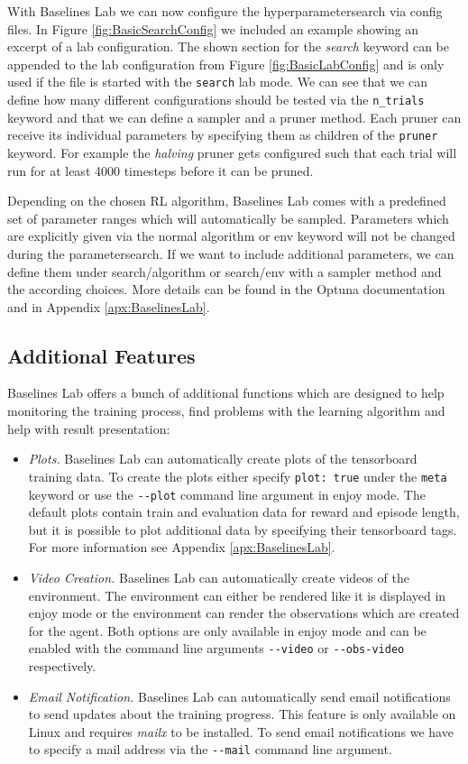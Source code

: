 With Baselines Lab we can now configure the hyperparametersearch via config files. In Figure \ref{fig:BasicSearchConfig} we included an example showing an excerpt of a lab configuration. The shown section for the \textit{search} keyword can be appended to the lab configuration from Figure \ref{fig:BasicLabConfig} and is only used if the file is started with the \texttt{search} lab mode. We can see that we can define how many different configurations should be tested via the \texttt{n\_trials} keyword and that we can define a sampler and a pruner method. Each pruner can receive its individual parameters by specifying them as children of the \texttt{pruner} keyword. For example the \textit{halving} pruner gets configured such that each trial will run for at least 4000 timesteps before it can be pruned.

Depending on the chosen RL algorithm, Baselines Lab comes with a predefined set of parameter ranges which will automatically be sampled. Parameters which are explicitly given via the normal algorithm or env keyword will not be changed during the parametersearch. If we want to include additional parameters, we can define them under search/algorithm or search/env with a sampler method and the according choices. More details can be found in the Optuna documentation \cite{optuna-docs} and in Appendix \ref{apx:BaselinesLab}.

\subsection{Additional Features} \label{sec:blAdvanced}
Baselines Lab offers a bunch of additional functions which are designed to help monitoring the training process, find problems with the learning algorithm and help with result presentation:

\begin{itemize}
    \item \textit{Plots.} Baselines Lab can automatically create plots of the tensorboard training data. To create the plots either specify \texttt{plot: true} under the \texttt{meta} keyword or use the \texttt{-{}-plot} command line argument in enjoy mode. The default plots contain train and evaluation data for reward and episode length, but it is possible to plot additional data by specifying their tensorboard tags. For more information see Appendix \ref{apx:BaselinesLab}.
    \item \textit{Video Creation.} Baselines Lab can automatically create videos of  the environment. The environment can either be rendered like it is displayed in enjoy mode or the environment can render the observations which are created for the agent. Both options are only available in enjoy mode and can be enabled with the command line arguments \texttt{-{}-video} or \texttt{-{}-obs-video} respectively.
    \item \textit{Email Notification.} Baselines Lab can automatically send email notifications to send updates about the training progress. This feature is only available on Linux and requires \textit{mailx} to be installed. To send email notifications we have to specify a mail address via the \texttt{-{}-mail} command line argument. 
\end{itemize}


